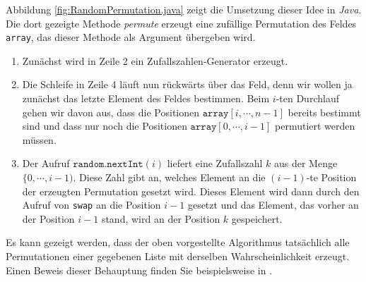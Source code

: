 Abbildung \ref{fig:RandomPermutation.java} zeigt die Umsetzung dieser Idee in \textsl{Java}.
Die dort gezeigte Methode \textsl{permute} erzeugt eine zuf\"allige Permutation des Feldes \texttt{array}, das
dieser Methode als Argument \"ubergeben wird.
\begin{enumerate}
\item Zun\"achst wird in Zeile 2 ein Zufallszahlen-Generator erzeugt.
\item Die Schleife in Zeile 4 l\"auft nun r\"uckw\"arts \"uber das Feld, denn wir wollen ja zun\"achst 
      das letzte Element des Feldes bestimmen.  Beim $i$-ten Durchlauf gehen wir davon aus,
      dass die Positionen $\mathtt{array}[i, \cdots, n-1]$ bereits bestimmt sind
      und dass nur noch die Positionen $\mathtt{array}[0, \cdots, i-1]$ permutiert werden m\"ussen.
\item Der Aufruf $\texttt{random.nextInt}(i)$ liefert eine Zufallszahl $k$ aus der Menge 
      $\{0, \cdots, i-1)$.  Diese Zahl gibt an, welches Element an die $(i-1)$-te Position der
      erzeugten Permutation gesetzt wird. Dieses Element wird dann durch den Aufruf von
      \texttt{swap} an die Position $i-1$ gesetzt und das Element, das vorher an der Position $i-1$
      stand, wird an der Position $k$ gespeichert.
\end{enumerate}
Es kann gezeigt werden, dass der oben vorgestellte Algorithmus tats\"achlich alle Permutationen einer
gegebenen Liste mit derselben Wahrscheinlichkeit erzeugt.  Einen Beweis dieser Behauptung
finden Sie beispielsweise in \cite{cormen:01}.

